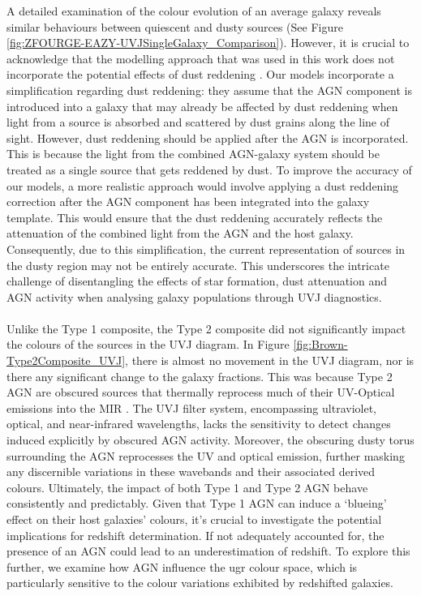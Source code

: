 A detailed examination of the colour evolution of an average galaxy reveals similar behaviours between quiescent and dusty sources (See Figure \ref{fig:ZFOURGE-EAZY-UVJSingleGalaxy_Comparison}). However, it is crucial to acknowledge that the modelling approach that was used in this work does not incorporate the potential effects of dust reddening \citep{bruzual_stellar_2003}. Our models incorporate a simplification regarding dust reddening: they assume that the AGN component is introduced into a galaxy that may already be affected by dust reddening when light from a source is absorbed and scattered by dust grains along the line of sight. However, dust reddening should be applied after the AGN is incorporated. This is because the light from the combined AGN-galaxy system should be treated as a single source that gets reddened by dust. To improve the accuracy of our models, a more realistic approach would involve applying a dust reddening correction after the AGN component has been integrated into the galaxy template. This would ensure that the dust reddening accurately reflects the attenuation of the combined light from the AGN and the host galaxy.
Consequently, due to this simplification, the current representation of sources in the dusty region may not be entirely accurate. This underscores the intricate challenge of disentangling the effects of star formation, dust attenuation and AGN activity when analysing galaxy populations through UVJ diagnostics. \\\\ Unlike the Type 1 composite, the Type 2 composite did not significantly impact the colours of the sources in the UVJ diagram. In Figure \ref{fig:Brown-Type2Composite_UVJ}, there is almost no movement in the UVJ diagram, nor is there any significant change to the galaxy fractions. This was because Type 2 AGN are obscured sources that thermally reprocess much of their UV-Optical emissions into the MIR \citep{padovani_active_2017}. The UVJ filter system, encompassing ultraviolet, optical, and near-infrared wavelengths, lacks the sensitivity to detect changes induced explicitly by obscured AGN activity. Moreover, the obscuring dusty torus surrounding the AGN reprocesses the UV and optical emission, further masking any discernible variations in these wavebands and their associated derived colours. Ultimately, the impact of both Type 1 and Type 2 AGN behave consistently and predictably.
Given that Type 1 AGN can induce a `blueing' effect on their host galaxies' colours, it's crucial to investigate the potential implications for redshift determination. If not adequately accounted for, the presence of an AGN could lead to an underestimation of redshift. To explore this further, we examine how AGN influence the ugr colour space, which is particularly sensitive to the colour variations exhibited by redshifted galaxies.
